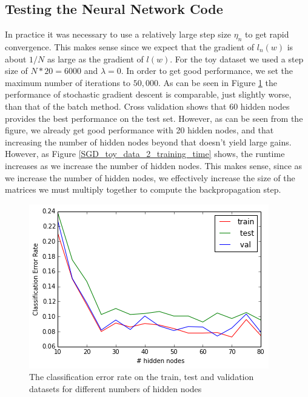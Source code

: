 \documentclass[10pt]{article}
\begin{document}
\subsection*{Testing the Neural Network Code}



In practice it was necessary to use a relatively large step size $\eta_n$ to get rapid convergence. This makes sense since we expect that the gradient of $l_n(w)$ is about $1/N$ as large as the gradient of $l(w)$. For the toy dataset we used a step size of $N*20 = 6000$ and $\lambda = 0$. In order to get good performance, we set the maximum number of iterations to $50,000$. As can be seen in Figure \ref{SGD_toy_data_2_CER} the performance of stochastic gradient descent is comparable, just slightly worse, than that of the batch method. Cross validation shows that 60 hidden nodes provides the best performance on the test set. However, as can be seen from the figure, we already get good performance with 20 hidden nodes, and that increasing the number of hidden nodes beyond that doesn't yield large gains. However, as Figure \ref{SGD_toy_data_2_training_time} shows, the runtime increases as we increase the number of hidden nodes. This makes sense, since as we increase the number of hidden nodes, we effectively increase the size of the matrices we must multiply together to compute the backpropagation step.

\begin{figure}
\centering
\includegraphics[scale=0.5]{SGD_toy_data_2_CER.png}
\caption{The classification error rate on the train, test and validation datasets for different numbers of hidden nodes}
\label{SGD_toy_data_2_CER}
\end{figure}
\end{document}
